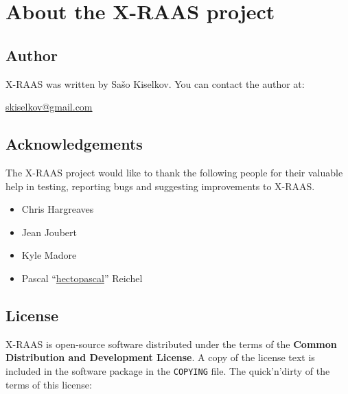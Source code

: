 \documentclass[a4paper,12pt]{article}
\begin{document}
\section{About the X-RAAS project}
\label{sec:About}

\subsection{Author}

X-RAAS was written by Sašo Kiselkov. You can contact the author at:

\vspace{1em}

\href{mailto:skiselkov@gmail.com}{skiselkov@gmail.com}

\subsection{Acknowledgements}

The X-RAAS project would like to thank the following people for their
valuable help in testing, reporting bugs and suggesting improvements to
X-RAAS.

\begin{itemize}

\item Chris Hargreaves

\item Jean Joubert

\item Kyle Madore

\item Pascal
``\href{https://www.youtube.com/channel/UCg7RwFfTBq19oIxUkjuo_Ig}{hectopascal}''
Reichel

\end{itemize}

\subsection{License}

X-RAAS is open-source software distributed under the terms of the
\textbf{Common Distribution and Development License}. A copy of the
license text is included in the software package in the \texttt{COPYING}
file. The quick'n'dirty of the terms of this license:
\end{document}
